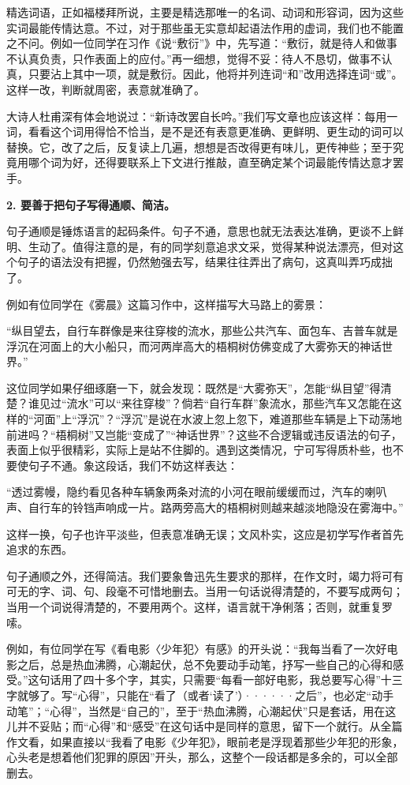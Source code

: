 精选词语，正如福楼拜所说，主要是精选那唯一的名词、动词和形容词，因为这些实词最能传情达意。不过，对于那些虽无实意却起语法作用的虚词，我们也不能置之不问。例如一位同学在习作《说“敷衍”》中，先写道：“敷衍，就是待人和做事不认真负责，只作表面上的应付。”再一细想，觉得不妥：待人不恳切，做事不认真，只要沾上其中一项，就是敷衍。因此，他将并列连词“和”改用选择连词“或”。这样一改，判断就周密，表意就准确了。

大诗人杜甫深有体会地说过：“新诗改罢自长吟。”我们写文章也应该这样：每用一词，看看这个词用得恰不恰当，是不是还有表意更准确、更鲜明、更生动的词可以替换。它，改了之后，反复读上几遍，想想是否改得更有味儿，更传神些；至于究竟用哪个词为好，还得要联系上下文进行推敲，直至确定某个词最能传情达意才罢手。

\textbf{2. 要善于把句子写得通顺、简洁。}

句子通顺是锤炼语言的起码条件。句子不通，意思也就无法表达准确，更谈不上鲜明、生动了。值得注意的是，有的同学刻意追求文采，觉得某种说法漂亮，但对这个句子的语法没有把握，仍然勉强去写，结果往往弄出了病句，这真叫弄巧成拙了。

例如有位同学在《雾晨》这篇习作中，这样描写大马路上的雾景：

“纵目望去，自行车群像是来往穿梭的流水，那些公共汽车、面包车、吉普车就是浮沉在河面上的大小船只，而河两岸高大的梧桐树仿佛变成了大雾弥天的神话世界。”

这位同学如果仔细琢磨一下，就会发现：既然是“大雾弥天”，怎能“纵目望”得清楚？谁见过“流水”可以“来往穿梭”？倘若“自行车群”象流水，那些汽车又怎能在这样的“河面”上“浮沉”？“浮沉”是说在水波上忽上忽下，难道那些车辆是上下动荡地前进吗？“梧桐树”又岂能“变成了”“神话世界”？这些不合逻辑或违反语法的句子，表面上似乎很精彩，实际上是站不住脚的。遇到这类情况，宁可写得质朴些，也不要使句子不通。象这段话，我们不妨这样表达：

“透过雾幔，隐约看见各种车辆象两条对流的小河在眼前缓缓而过，汽车的喇叭声、自行车的铃铛声响成一片。路两旁高大的梧桐树则越来越淡地隐没在雾海中。”

这样一换，句子也许平淡些，但表意准确无误；文风朴实，这应是初学写作者首先追求的东西。

句子通顺之外，还得简洁。我们要象鲁迅先生要求的那样，在作文时，竭力将可有可无的字、词、句、段毫不可惜地删去。当用一句话说得清楚的，不要写成两句；当用一个词说得清楚的，不要用两个。这样，语言就干净俐落；否则，就重复罗嗦。

例如，有位同学在写《看电影〈少年犯〉有感》的开头说：“我每当看了一次好电影之后，总是热血沸腾，心潮起伏，总不免要动手动笔，抒写一些自己的心得和感受。”这句话用了四十多个字，其实，只需要“每看一部好电影，我总要写心得”十三字就够了。写“心得”，只能在“看了（或者‘读了’）······之后”，也必定“动手动笔”；“心得”，当然是“自己的”，至于“热血沸腾，心潮起伏”只是套话，用在这儿并不妥贴；而“心得”和“感受”在这句话中是同样的意思，留下一个就行。从全篇作文看，如果直接以“我看了电影《少年犯》，眼前老是浮现着那些少年犯的形象，心头老是想着他们犯罪的原因”开头，那么，这整个一段话都是多余的，可以全部删去。

